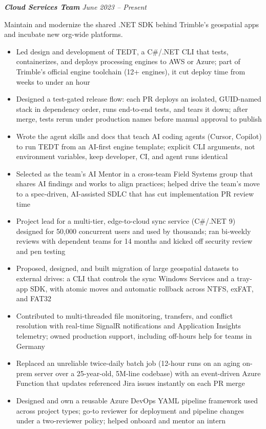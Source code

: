 \documentclass[10pt,letterpaper]{article}
\newcommand{\resumeTeam}[2]{%
  \vspace{3pt}\textbf{\textit{#1}} \hfill \textit{#2} \par
}
\begin{document}
\resumeTeam{Cloud Services Team}{June 2023 -- Present}
Maintain and modernize the shared .NET SDK behind Trimble's geospatial apps and incubate new org-wide platforms.
\begin{itemize}
  \item Led design and development of TEDT, a C\#/.NET CLI that tests, containerizes, and deploys processing engines to AWS or Azure; part of Trimble's official engine toolchain (12+ engines), it cut deploy time from weeks to under an hour
  \item Designed a test-gated release flow: each PR deploys an isolated, GUID-named stack in dependency order, runs end-to-end tests, and tears it down; after merge, tests rerun under production names before manual approval to publish
  \item Wrote the agent skills and docs that teach AI coding agents (Cursor, Copilot) to run TEDT from an AI-first engine template; explicit CLI arguments, not environment variables, keep developer, CI, and agent runs identical
  \item Selected as the team's AI Mentor in a cross-team Field Systems group that shares AI findings and works to align practices; helped drive the team's move to a spec-driven, AI-assisted SDLC that has cut implementation PR review time
  \item Project lead for a multi-tier, edge-to-cloud sync service (C\#/.NET 9) designed for 50,000 concurrent users and used by thousands; ran bi-weekly reviews with dependent teams for 14 months and kicked off security review and pen testing
  \item Proposed, designed, and built migration of large geospatial datasets to external drives: a CLI that controls the sync Windows Services and a tray-app SDK, with atomic moves and automatic rollback across NTFS, exFAT, and FAT32
  \item Contributed to multi-threaded file monitoring, transfers, and conflict resolution with real-time SignalR notifications and Application Insights telemetry; owned production support, including off-hours help for teams in Germany
  \item Replaced an unreliable twice-daily batch job (12-hour runs on an aging on-prem server over a 25-year-old, 5M-line codebase) with an event-driven Azure Function that updates referenced Jira issues instantly on each PR merge
  \item Designed and own a reusable Azure DevOps YAML pipeline framework used across project types; go-to reviewer for deployment and pipeline changes under a two-reviewer policy; helped onboard and mentor an intern
\end{itemize}
\end{document}
